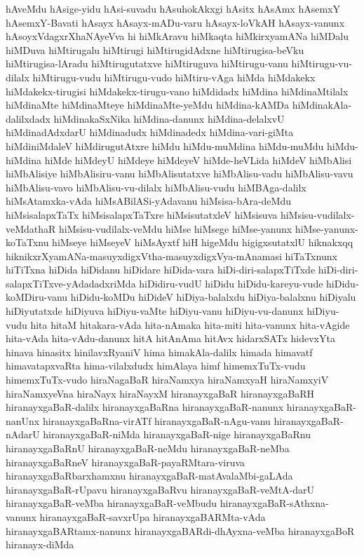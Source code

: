 {hAveMdu
hAsige-yidu
hAsi-suvadu
hAsuhokAkxgi
hAsitx
hAsAmx
hAsemxY
hAsemxY-Bavati
hAsayx
hAsayx-mADu-varu
hAsayx-loVkAH
hAsayx-vanunx
hAsoyxVdagxrXhaNAyeVva
hi
hiMkAravu
hiMkaqta
hiMkirxyamANa
hiMDalu
hiMDuva
hiMtirugalu
hiMtirugi
hiMtirugidAdxne
hiMtirugisa-beVku
hiMtirugisa-lAradu
hiMtirugutatxve
hiMtiruguva
hiMtirugu-vanu
hiMtirugu-vu-dilalx
hiMtirugu-vudu
hiMtirugu-vudo
hiMtiru-vAga
hiMda
hiMdakekx
hiMdakekx-tirugisi
hiMdakekx-tirugu-vano
hiMdidadx
hiMdina
hiMdinaMtilalx
hiMdinaMte
hiMdinaMteye
hiMdinaMte-yeMdu
hiMdina-kAMDa
hiMdinakAla-dalilxdadx
hiMdinakaSxNika
hiMdina-danunx
hiMdina-delalxvU
hiMdinadAdxdarU
hiMdinadudx
hiMdinadedx
hiMdina-vari-giMta
hiMdiniMdaleV
hiMdirugutAtxre
hiMdu
hiMdu-muMdina
hiMdu-muMdu
hiMdu-hiMdina
hiMde
hiMdeyU
hiMdeye
hiMdeyeV
hiMde-heVLida
hiMdeV
hiMbAlisi
hiMbAlisiye
hiMbAlisiru-vanu
hiMbAlisutatxve
hiMbAlisu-vadu
hiMbAlisu-vavu
hiMbAlisu-vavo
hiMbAlisu-vu-dilalx
hiMbAlisu-vudu
hiMBAga-dalilx
hiMsAtamxka-vAda
hiMsABilASi-yAdavanu
hiMsisa-bAra-deMdu
hiMsisalapxTaTx
hiMsisalapxTaTxre
hiMsisutatxleV
hiMsisuva
hiMsisu-vudilalx-veMdathaR
hiMsisu-vudilalx-veMdu
hiMse
hiMsege
hiMse-yanunx
hiMse-yanunx-koTaTxnu
hiMseye
hiMseyeV
hiMsAyxtf
hiH
higeMdu
higigxsutatxlU
hiknakxqq
hiknikxrXyamANa-masuyxdigxVtha-masuyxdigxVya-mAnamasi
hiTaTxnunx
hiTiTxna
hiDida
hiDidanu
hiDidare
hiDida-vara
hiDi-diri-salapxTiTxde
hiDi-diri-salapxTiTxve-yAdadadxriMda
hiDidiru-vudU
hiDidu
hiDidu-kareyu-vude
hiDidu-koMDiru-vanu
hiDidu-koMDu
hiDideV
hiDiya-balalxdu
hiDiya-balalxnu
hiDiyalu
hiDiyutatxde
hiDiyuva
hiDiyu-vaMte
hiDiyu-vanu
hiDiyu-vu-danunx
hiDiyu-vudu
hita
hitaM
hitakara-vAda
hita-nAmaka
hita-miti
hita-vanunx
hita-vAgide
hita-vAda
hita-vAdu-danunx
hitA
hitAnAma
hitAvx
hidarxSATx
hidevxYta
hinava
hinasitx
hinilavxRyaniV
hima
himakAla-dalilx
himada
himavatf
himavatapxvaRta
hima-vilalxdudx
himAlaya
himf
himemxTuTx-vudu
himemxTuTx-vudo
hiraNagaBaR
hiraNamxya
hiraNamxyaH
hiraNamxyiV
hiraNamxyeVna
hiraNayx
hiraNayxM
hiranayxgaBaR
hiranayxgaBaRH
hiranayxgaBaR-dalilx
hiranayxgaBaRna
hiranayxgaBaR-nanunx
hiranayxgaBaR-nanUnx
hiranayxgaBaRna-virATf
hiranayxgaBaR-nAgu-vanu
hiranayxgaBaR-nAdarU
hiranayxgaBaR-niMda
hiranayxgaBaR-nige
hiranayxgaBaRnu
hiranayxgaBaRnU
hiranayxgaBaR-neMdu
hiranayxgaBaR-neMba
hiranayxgaBaRneV
hiranayxgaBaR-payaRMtara-viruva
hiranayxgaBaRbarxhamxnu
hiranayxgaBaR-matAvalaMbi-gaLAda
hiranayxgaBaR-rUpavu
hiranayxgaBaRvu
hiranayxgaBaR-veMtA-darU
hiranayxgaBaR-veMba
hiranayxgaBaR-veMbudu
hiranayxgaBaR-sAthxna-vanunx
hiranayxgaBaR-savxrUpa
hiranayxgaBARMta-vAda
hiranayxgaBARtamx-nanunx
hiranayxgaBARdi-dhAyxna-veMba
hiranayxgaBoR
hiranayx-diMda
}

